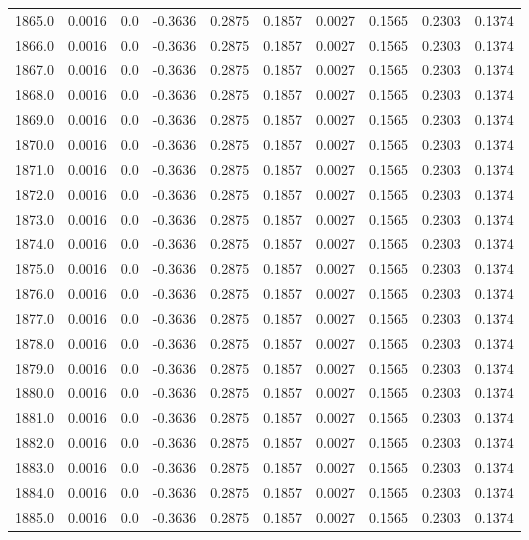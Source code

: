 \begin{longtable}{lrrrrrrrrr}
1865.0 & 0.0016 & 0.0 & -0.3636 & 0.2875 & 0.1857 & 0.0027 & 0.1565 & 0.2303 & 0.1374 \\
1866.0 & 0.0016 & 0.0 & -0.3636 & 0.2875 & 0.1857 & 0.0027 & 0.1565 & 0.2303 & 0.1374 \\
1867.0 & 0.0016 & 0.0 & -0.3636 & 0.2875 & 0.1857 & 0.0027 & 0.1565 & 0.2303 & 0.1374 \\
1868.0 & 0.0016 & 0.0 & -0.3636 & 0.2875 & 0.1857 & 0.0027 & 0.1565 & 0.2303 & 0.1374 \\
1869.0 & 0.0016 & 0.0 & -0.3636 & 0.2875 & 0.1857 & 0.0027 & 0.1565 & 0.2303 & 0.1374 \\
1870.0 & 0.0016 & 0.0 & -0.3636 & 0.2875 & 0.1857 & 0.0027 & 0.1565 & 0.2303 & 0.1374 \\
1871.0 & 0.0016 & 0.0 & -0.3636 & 0.2875 & 0.1857 & 0.0027 & 0.1565 & 0.2303 & 0.1374 \\
1872.0 & 0.0016 & 0.0 & -0.3636 & 0.2875 & 0.1857 & 0.0027 & 0.1565 & 0.2303 & 0.1374 \\
1873.0 & 0.0016 & 0.0 & -0.3636 & 0.2875 & 0.1857 & 0.0027 & 0.1565 & 0.2303 & 0.1374 \\
1874.0 & 0.0016 & 0.0 & -0.3636 & 0.2875 & 0.1857 & 0.0027 & 0.1565 & 0.2303 & 0.1374 \\
1875.0 & 0.0016 & 0.0 & -0.3636 & 0.2875 & 0.1857 & 0.0027 & 0.1565 & 0.2303 & 0.1374 \\
1876.0 & 0.0016 & 0.0 & -0.3636 & 0.2875 & 0.1857 & 0.0027 & 0.1565 & 0.2303 & 0.1374 \\
1877.0 & 0.0016 & 0.0 & -0.3636 & 0.2875 & 0.1857 & 0.0027 & 0.1565 & 0.2303 & 0.1374 \\
1878.0 & 0.0016 & 0.0 & -0.3636 & 0.2875 & 0.1857 & 0.0027 & 0.1565 & 0.2303 & 0.1374 \\
1879.0 & 0.0016 & 0.0 & -0.3636 & 0.2875 & 0.1857 & 0.0027 & 0.1565 & 0.2303 & 0.1374 \\
1880.0 & 0.0016 & 0.0 & -0.3636 & 0.2875 & 0.1857 & 0.0027 & 0.1565 & 0.2303 & 0.1374 \\
1881.0 & 0.0016 & 0.0 & -0.3636 & 0.2875 & 0.1857 & 0.0027 & 0.1565 & 0.2303 & 0.1374 \\
1882.0 & 0.0016 & 0.0 & -0.3636 & 0.2875 & 0.1857 & 0.0027 & 0.1565 & 0.2303 & 0.1374 \\
1883.0 & 0.0016 & 0.0 & -0.3636 & 0.2875 & 0.1857 & 0.0027 & 0.1565 & 0.2303 & 0.1374 \\
1884.0 & 0.0016 & 0.0 & -0.3636 & 0.2875 & 0.1857 & 0.0027 & 0.1565 & 0.2303 & 0.1374 \\
1885.0 & 0.0016 & 0.0 & -0.3636 & 0.2875 & 0.1857 & 0.0027 & 0.1565 & 0.2303 & 0.1374 \\

\end{longtable}
